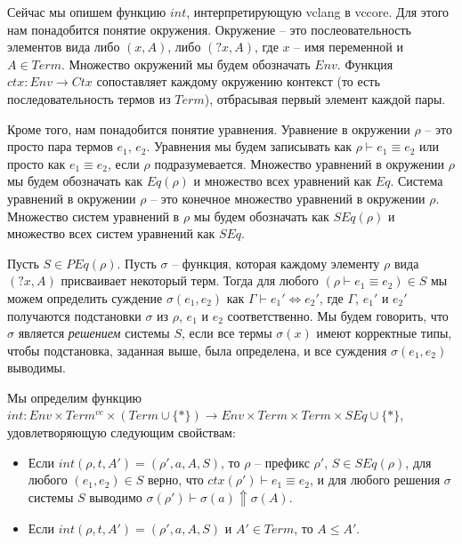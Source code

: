 \documentclass{amsart}
\theoremstyle{definition}
\theoremstyle{remark}
\newcommand{\deq}{\Leftrightarrow}
\numberwithin{figure}{section}
\begin{document}
Сейчас мы опишем функцию $int$, интерпретирующую vclang в vccore.
Для этого нам понадобится понятие окружения.
Окружение -- это послеовательность элементов вида либо $(x,A)$, либо $(?x,A)$, где $x$ -- имя переменной и $A \in Term$.
Множество окружений мы будем обозначать $Env$.
Функция $ctx : Env \to Ctx$ сопоставляет каждому окружению контекст (то есть последовательность термов из $Term$), отбрасывая первый элемент каждой пары.

Кроме того, нам понадобится понятие уравнения.
Уравнение в окружении $\rho$ -- это просто пара термов $e_1$, $e_2$.
Уравнения мы будем записывать как $\rho \vdash e_1 \equiv e_2$ или просто как $e_1 \equiv e_2$, если $\rho$ подразумевается.
Множество уравнений в окружении $\rho$ мы будем обозначать как $Eq(\rho)$ и множество всех уравнений как $Eq$.
Система уравнений в окружении $\rho$ -- это конечное множество уравнений в окружении $\rho$.
Множество систем уравнений в $\rho$ мы будем обозначать как $SEq(\rho)$ и множество всех систем уравнений как $SEq$.

Пусть $S \in PEq(\rho)$.
Пусть $\sigma$ -- функция, которая каждому элементу $\rho$ вида $(?x,A)$ присваивает некоторый терм.
Тогда для любого $(\rho \vdash e_1 \equiv e_2) \in S$ мы можем определить суждение $\sigma(e_1,e_2)$ как $\Gamma \vdash e_1' \deq e_2'$, где
$\Gamma$, $e_1'$ и $e_2'$ получаются подстановки $\sigma$ из $\rho$, $e_1$ и $e_2$ соответственно.
Мы будем говорить, что $\sigma$ является \emph{решением} системы $S$, если все термы $\sigma(x)$ имеют корректные типы,
чтобы подстановка, заданная выше, была определена, и все суждения $\sigma(e_1,e_2)$ выводимы.

Мы определим функцию $int : Env \times Term^{vc} \times (Term \cup \{ * \}) \to Env \times Term \times Term \times SEq \cup \{ * \}$, удовлетворяющую следующим свойствам:
\begin{itemize}
\item Если $int(\rho, t, A') = (\rho', a, A, S)$, то $\rho$ -- префикс $\rho'$, $S \in SEq(\rho)$, для любого $(e_1,e_2) \in S$ верно,
    что $ctx(\rho') \vdash e_1 \equiv e_2$, и для любого решения $\sigma$ системы $S$ выводимо $\sigma(\rho') \vdash \sigma(a) \Uparrow \sigma(A)$.
\item Если $int(\rho, t, A') = (\rho', a, A, S)$ и $A' \in Term$, то $A \leq A'$.
\end{itemize}
\end{document}
